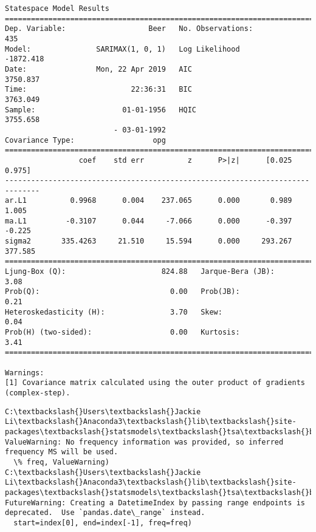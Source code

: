 \documentclass[11pt]{article}
\begin{document}
    \begin{Verbatim}[commandchars=\\\{\}]
                           Statespace Model Results                           
==============================================================================
Dep. Variable:                   Beer   No. Observations:                  435
Model:               SARIMAX(1, 0, 1)   Log Likelihood               -1872.418
Date:                Mon, 22 Apr 2019   AIC                           3750.837
Time:                        22:36:31   BIC                           3763.049
Sample:                    01-01-1956   HQIC                          3755.658
                         - 03-01-1992                                         
Covariance Type:                  opg                                         
==============================================================================
                 coef    std err          z      P>|z|      [0.025      0.975]
------------------------------------------------------------------------------
ar.L1          0.9968      0.004    237.065      0.000       0.989       1.005
ma.L1         -0.3107      0.044     -7.066      0.000      -0.397      -0.225
sigma2       335.4263     21.510     15.594      0.000     293.267     377.585
===================================================================================
Ljung-Box (Q):                      824.88   Jarque-Bera (JB):                 3.08
Prob(Q):                              0.00   Prob(JB):                         0.21
Heteroskedasticity (H):               3.70   Skew:                             0.04
Prob(H) (two-sided):                  0.00   Kurtosis:                         3.41
===================================================================================

Warnings:
[1] Covariance matrix calculated using the outer product of gradients (complex-step).

    \end{Verbatim}

    \begin{Verbatim}[commandchars=\\\{\}]
C:\textbackslash{}Users\textbackslash{}Jackie Li\textbackslash{}Anaconda3\textbackslash{}lib\textbackslash{}site-packages\textbackslash{}statsmodels\textbackslash{}tsa\textbackslash{}base\textbackslash{}tsa\_model.py:171: ValueWarning: No frequency information was provided, so inferred frequency MS will be used.
  \% freq, ValueWarning)
C:\textbackslash{}Users\textbackslash{}Jackie Li\textbackslash{}Anaconda3\textbackslash{}lib\textbackslash{}site-packages\textbackslash{}statsmodels\textbackslash{}tsa\textbackslash{}base\textbackslash{}tsa\_model.py:191: FutureWarning: Creating a DatetimeIndex by passing range endpoints is deprecated.  Use `pandas.date\_range` instead.
  start=index[0], end=index[-1], freq=freq)

    \end{Verbatim}
\end{document}

